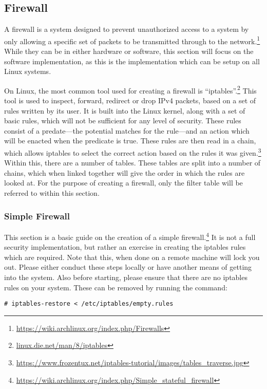 				\subsection{Firewall}
					A firewall is a system designed to prevent unauthorized access to a system by only allowing a specific set of packets to be transmitted through to the network.\footnote{\url{https://wiki.archlinux.org/index.php/Firewalls}}
					While they can be in either hardware or software, this section will focus on the software implementation, as this is the implementation which can be setup on all Linux systems.

					On Linux, the most common tool used for creating a firewall is ``iptables''.\footnote{\url{linux.die.net/man/8/iptables}}
					This tool is used to inspect, forward, redirect or drop IPv4 packets, based on a set of rules written by its user.
					It is built into the Linux kernel, along with a set of basic rules, which will not be sufficient for any level of security.
					These rules consist of a predate---the potential matches for the rule---and an action which will be enacted when the predicate is true.
					These rules are then read in a chain, which allows iptables to select the correct action based on the rules it was given.\footnote{\url{https://www.frozentux.net/iptables-tutorial/images/tables\_traverse.jpg}}
					Within this, there are a number of tables.
					These tables are split into a number of chains, which when linked together will give the order in which the rules are looked at.
					For the purpose of creating a firewall, only the filter table will be referred to within this section.

					\subsubsection{Simple Firewall}
						This section is a basic guide on the creation of a simple firewall.\footnote{\url{https://wiki.archlinux.org/index.php/Simple\_stateful\_firewall}}
						It is not a full security implementation, but rather an exercise in creating the iptables rules which are required.
						Note that this, when done on a remote machine will lock you out.
						Please either conduct these steps locally or have another means of getting into the system.
						Also before starting, please ensure that there are no iptables rules on your system.
						These can be removed by running the command:
						\begin{lstlisting}[style=CLI]
							# iptables-restore < /etc/iptables/empty.rules
						\end{lstlisting}


